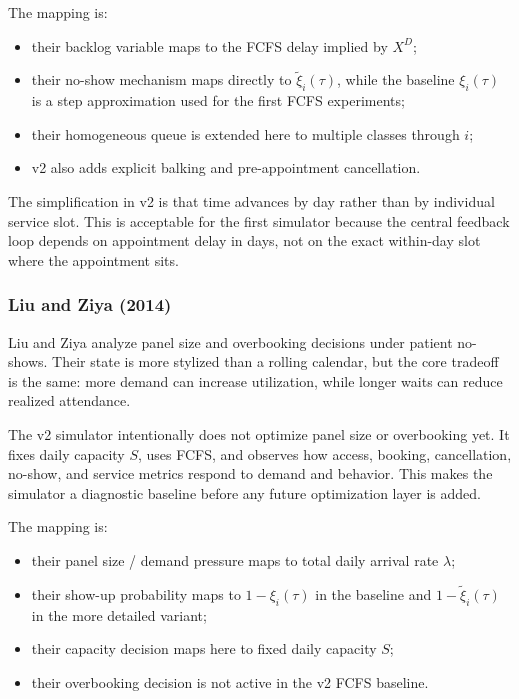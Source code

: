 \documentclass[11pt]{article}
\begin{document}
The mapping is:
\begin{itemize}[nosep]
    \item their backlog variable maps to the FCFS delay implied by \(X^D\);
    \item their no-show mechanism maps directly to \(\tilde{\xi}_i(\tau)\), while the baseline \(\xi_i(\tau)\) is a step approximation used for the first FCFS experiments;
    \item their homogeneous queue is extended here to multiple classes through \(i\);
    \item v2 also adds explicit balking and pre-appointment cancellation.
\end{itemize}

The simplification in v2 is that time advances by day rather than by individual service slot. This
is acceptable for the first simulator because the central feedback loop depends on appointment
delay in days, not on the exact within-day slot where the appointment sits.

\subsubsection{Liu and Ziya (2014)}

Liu and Ziya analyze panel size and overbooking decisions under patient no-shows. Their state is
more stylized than a rolling calendar, but the core tradeoff is the same: more demand can increase
utilization, while longer waits can reduce realized attendance.

The v2 simulator intentionally does not optimize panel size or overbooking yet. It fixes daily
capacity \(S\), uses FCFS, and observes how access, booking, cancellation, no-show, and service
metrics respond to demand and behavior. This makes the simulator a diagnostic baseline before any
future optimization layer is added.

The mapping is:
\begin{itemize}[nosep]
    \item their panel size / demand pressure maps to total daily arrival rate \(\lambda\);
    \item their show-up probability maps to \(1-\xi_i(\tau)\) in the baseline and \(1-\tilde{\xi}_i(\tau)\) in the more detailed variant;
    \item their capacity decision maps here to fixed daily capacity \(S\);
    \item their overbooking decision is not active in the v2 FCFS baseline.
\end{itemize}
\end{document}
